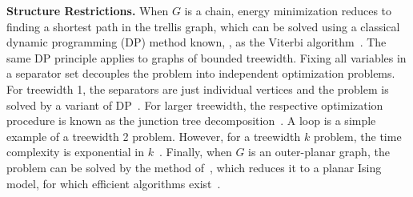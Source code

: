 \textbf{Structure Restrictions.} When $G$ is a chain, energy minimization
reduces to finding a shortest path in the trellis graph, which can be solved using a classical dynamic programming (DP) method known, \eg, as the Viterbi algorithm~\cite{forney1973viterbi}.
The same DP principle applies to graphs of bounded treewidth.  Fixing all variables in a separator set decouples the problem into independent optimization problems. For treewidth 1, the separators are just individual vertices and the problem is solved by a variant of DP~\cite{Pearl-88,SchlesingerHlavac2002}.
For larger treewidth, the respective optimization procedure is known as the junction tree decomposition~\cite{Lauritzen96}. A loop is a simple example of a treewidth 2 problem. However, for a treewidth $k$ problem, the time complexity is exponential in $k$~\cite{Lauritzen96}.
Finally, when $G$ is an outer-planar graph, the problem can be solved by the method of~\cite{Schraudolph-10}, which reduces it to a planar Ising model, for which efficient algorithms exist~\cite{Shih-90}.


